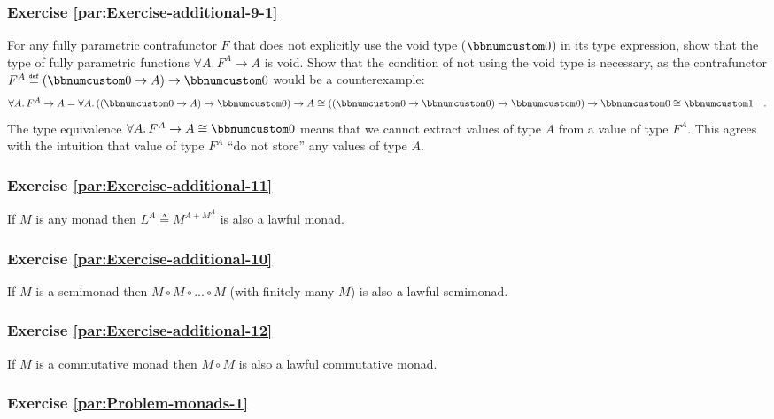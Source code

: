 \subsubsection{Exercise \label{par:Exercise-additional-9-1}\ref{par:Exercise-additional-9-1}}

For any fully parametric contrafunctor $F$ that does not explicitly
use the void type ($\bbnum 0$) in its type expression,
show that the type of fully parametric functions $\forall A.\,F^{A}\rightarrow A$
is void. Show that the condition of not using the void type is necessary,
as the contrafunctor $F^{A}\triangleq(\bbnum 0\rightarrow A)\rightarrow\bbnum 0$
would be a counterexample:
\[
\forall A.\,F^{A}\rightarrow A=\forall A.\,((\bbnum 0\rightarrow A)\rightarrow\bbnum 0)\rightarrow A\cong((\bbnum 0\rightarrow\bbnum 0)\rightarrow\bbnum 0)\rightarrow\bbnum 0\cong\bbnum 1\quad.
\]
The type equivalence $\forall A.\,F^{A}\rightarrow A\cong\bbnum 0$
means that we cannot extract values of type $A$ from a value of type
$F^{A}$. This agrees with the intuition that value of type $F^{A}$
\textsf{``}do not store\textsf{''} any values of type $A$.

\subsubsection{Exercise \label{par:Exercise-additional-11}\ref{par:Exercise-additional-11}}

If $M$ is any monad then $L^{A}\triangleq M^{A+M^{A}}$ is also a
lawful monad.

\subsubsection{Exercise \label{par:Exercise-additional-10}\ref{par:Exercise-additional-10}}

If $M$ is a semimonad then $M\circ M\circ...\circ M$ (with finitely
many $M$) is also a lawful semimonad.

\subsubsection{Exercise \label{par:Exercise-additional-12}\ref{par:Exercise-additional-12}}

If $M$ is a commutative monad then $M\circ M$ is also a lawful commutative
monad.

\subsubsection{Exercise \label{par:Problem-monads-1}\ref{par:Problem-monads-1}}

